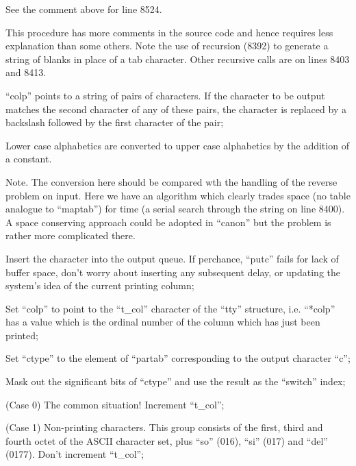 
See the comment above for line 8524.


This procedure has more comments in the
source code and hence requires less
explanation than some others. Note the
use of recursion (8392) to generate a
string of blanks in place of a tab
character. Other recursive calls are
on lines 8403 and 8413.


\bd
\item[8400:] ``colp'' points to a string of
pairs of characters. If the character to be output matches the
second character of any of these
pairs, the character is replaced
by a backslash followed by the first character of the pair;

\item[8407:] Lower case alphabetics are converted to upper case alphabetics
by the addition of a constant.
\ed

\noindent Note. The conversion here should be
compared wth the handling of the
reverse problem on input. Here we have
an algorithm which clearly trades space
(no table analogue to ``maptab'') for
time (a serial search through the
string on line 8400). A space conserving
approach could be adopted in
``canon'' but the problem is rather more
complicated there.

\bd
\item[8414:] Insert the character into the
output queue. If perchance,
``putc'' fails for lack of buffer
space, don't worry about inserting any subsequent delay, or
updating the system's idea of the
current printing column;

\item[8423:] Set ``colp'' to point to the
``t\_col'' character of the ``tty''
structure, i.e. ``*colp'' has a
value which is the ordinal number
of the column which has just been
printed;

\item[8424:] Set ``ctype'' to the element of
``partab'' corresponding to the
output character ``c'';


\item[8426:] Mask out the significant bits of
``ctype'' and use the result as the
``switch'' index;

\item[8428:] (Case 0) The common situation!
Increment ``t\_col'';

\item[8431:] (Case 1) Non-printing characters.
This group consists of the first,
third and fourth octet of the
ASCII character set, plus ``so''
(016), ``si'' (017) and ``del''
(0177). Don't increment ``t\_col'';

